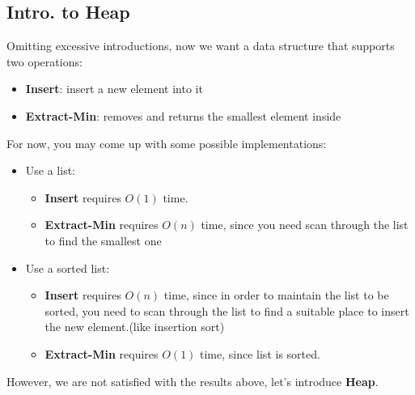 \begin{spacing}{1.3}
    \section{Intro. to Heap}

    Omitting excessive introductions, now we want a data structure that supports 
    two operations:
    \begin{itemize}
        \item {\bf Insert}: insert a new element into it
        \item {\bf Extract-Min}: removes and returns the smallest element inside
    \end{itemize}

    For now, you may come up with some possible implementations:
    \begin{itemize}
        \item Use a list:
            \begin{itemize}
                \item {\bf Insert} requires $O(1)$ time.
                \item {\bf Extract-Min} requires $O(n)$ time, since you need scan 
                through the list to find the smallest one
            \end{itemize}
        \item Use a sorted list:
            \begin{itemize}
                \item {\bf Insert} requires $O(n)$ time, since in order to 
                maintain the list to be sorted, you need to scan through the list 
                to find a suitable place to insert the new element.(like insertion sort)
                \item {\bf Extract-Min} requires $O(1)$ time, since list is sorted.
            \end{itemize}
    \end{itemize}

    However, we are not satisfied with the results above, let's introduce {\bf Heap}.


\end{spacing}
